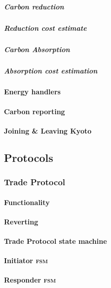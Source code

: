 \documentclass[]{article} %
\begin{document}
\subparagraph{Carbon reduction}

\subparagraph{Reduction cost estimate}

\subparagraph{Carbon Absorption}

\subparagraph{Absorption cost estimation}

\paragraph{Energy handlers}

\paragraph{Carbon reporting}

\paragraph{Joining \& Leaving Kyoto}

\subsection{Protocols}

\subsubsection{Trade Protocol}

\paragraph{Functionality}

\paragraph{Reverting}

\paragraph{Trade Protocol state machine}

\paragraph{Initiator \textsc{fsm}}

\paragraph{Responder \textsc{fsm}}
\end{document}
